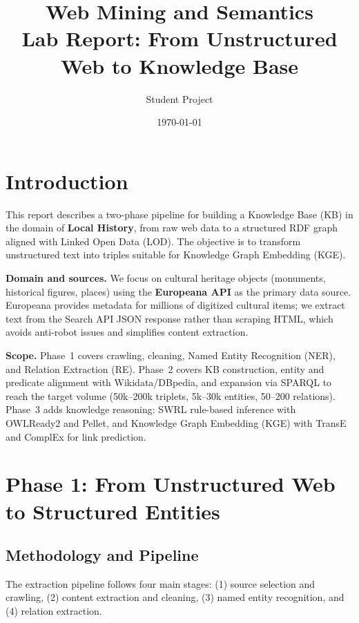 \documentclass[11pt,a4paper]{article}
\title{Web Mining and Semantics\\Lab Report: From Unstructured Web to Knowledge Base}
\author{Student Project}
\date{\today}
\begin{document}
  \maketitle

  \section{Introduction}

  This report describes a two-phase pipeline for building a Knowledge Base (KB) in the domain of \textbf{Local History}, from raw web data to a structured RDF graph aligned with Linked Open Data (LOD). The objective is to transform unstructured text into triples suitable for Knowledge Graph Embedding (KGE).

  \textbf{Domain and sources.} We focus on cultural heritage objects (monuments, historical figures, places) using the \textbf{Europeana API} as the primary data source. Europeana provides metadata for millions of digitized cultural items; we extract text from the Search API JSON response rather than scraping HTML, which avoids anti-robot issues and simplifies content extraction.

  \textbf{Scope.} Phase~1 covers crawling, cleaning, Named Entity Recognition (NER), and Relation Extraction (RE). Phase~2 covers KB construction, entity and predicate alignment with Wikidata/DBpedia, and expansion via SPARQL to reach the target volume (50k--200k triplets, 5k--30k entities, 50--200 relations). Phase~3 adds knowledge reasoning: SWRL rule-based inference with OWLReady2 and Pellet, and Knowledge Graph Embedding (KGE) with TransE and ComplEx for link prediction.

  \section{Phase 1: From Unstructured Web to Structured Entities}

  \subsection{Methodology and Pipeline}

  The extraction pipeline follows four main stages: (1) source selection and crawling, (2) content extraction and cleaning, (3) named entity recognition, and (4) relation extraction.
\end{document}
